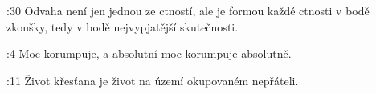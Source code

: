 :30 {Odvaha není jen jednou ze ctností, ale je formou každé ctnosti v bodě zkoušky, tedy v bodě nejvypjatější skutečnosti.
}

:4 {Moc korumpuje, a absolutní moc korumpuje absolutně. } 


:11 {Život křesťana je život na území okupovaném nepřáteli. }


\endinput

\switch {BKR}{}%
        {PSP}{}%
        {CSP}{}%
        {CEP}{}%
        {B21}{}%
        {SNC}{}%





\ww {}  %
    {} %
    {}  %
    {} %
    {}  %
    {}  %
\ww {}={}  %
    {}={}  %
    {}={}   %
    {}={}  %
    {}={}   %
    {}={}   %
    
\Note 12:1 {}={}  \x// (<"">) (<"">) 

 >> Ptolemaios II Filadelfos incest s Arsinou II
 >> Ptolemaios III Euergetes rozvedl z Láodikou, oženil s Berenikou
 >> Ptolemaios IV? Filopator
 >> Ptolemaios V == Kleopatra III
 >> Ptolemaios VI
 >> Kleopatry III  
 >> Ptolemaios IX Soter  (Ptolemaios X jeho brácha) syn Kleopatry III + Ptolemaia VIII  
 >> Ptolemaios XII 
 >> Kleopatra VII
